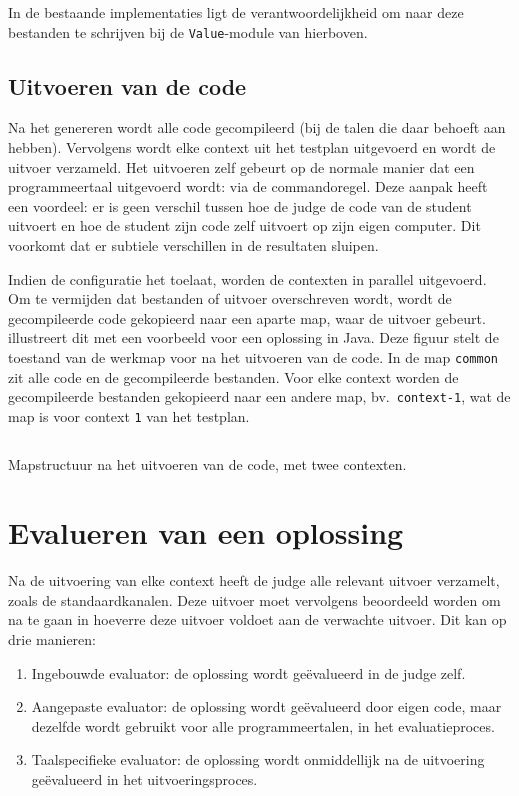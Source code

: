 In de bestaande implementaties ligt de verantwoordelijkheid om naar deze bestanden te schrijven bij de \texttt{Value}-module van hierboven.

\subsection{Uitvoeren van de code}\label{subsec:uitvoeren-van-de-code}

Na het genereren wordt alle code gecompileerd (bij de talen die daar behoeft aan hebben).
Vervolgens wordt elke context uit het testplan uitgevoerd en wordt de uitvoer verzameld.
Het uitvoeren zelf gebeurt op de normale manier dat een programmeertaal uitgevoerd wordt: via de commandoregel.
Deze aanpak heeft een voordeel: er is geen verschil tussen hoe de judge de code van de student uitvoert en hoe de student zijn code zelf uitvoert op zijn eigen computer.
Dit voorkomt dat er subtiele verschillen in de resultaten sluipen.

Indien de configuratie het toelaat, worden de contexten in parallel uitgevoerd.
Om te vermijden dat bestanden of uitvoer overschreven wordt, wordt de gecompileerde code gekopieerd naar een aparte map, waar de uitvoer gebeurt.
 illustreert dit met een voorbeeld voor een oplossing in Java.
Deze figuur stelt de toestand van de werkmap voor na het uitvoeren van de code.
In de map \texttt{common} zit alle code en de gecompileerde bestanden.
Voor elke context worden de gecompileerde bestanden gekopieerd naar een andere map, bv.\ \texttt{context-1}, wat de map is voor context \texttt{1} van het testplan.

\begin{listing}
    \inputminted{text}{code/dir-listing.txt}
    \caption{Mapstructuur na het uitvoeren van de code, met twee contexten.}
    \label{lst:mapstructuur}
\end{listing}

\section{Evalueren van een oplossing}\label{sec:evalueren-van-een-oplossing2}

Na de uitvoering van elke context heeft de judge alle relevant uitvoer verzamelt, zoals de standaardkanalen.
Deze uitvoer moet vervolgens beoordeeld worden om na te gaan in hoeverre deze uitvoer voldoet aan de verwachte uitvoer.
Dit kan op drie manieren:
\begin{enumerate}
    \item Ingebouwde evaluator: de oplossing wordt geëvalueerd in de judge zelf.
    \item Aangepaste evaluator: de oplossing wordt geëvalueerd door eigen code, maar dezelfde wordt gebruikt voor alle programmeertalen, in het evaluatieproces.
    \item Taalspecifieke evaluator: de oplossing wordt onmiddellijk na de uitvoering geëvalueerd in het uitvoeringsproces.
\end{enumerate}

